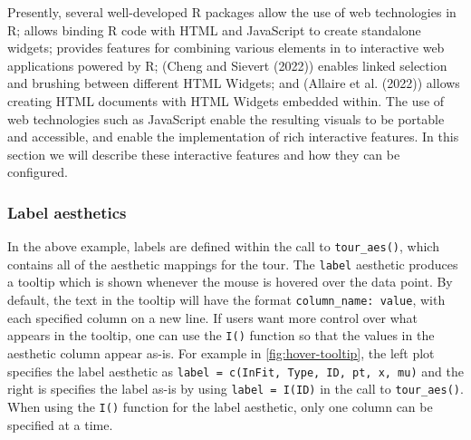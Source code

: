 Presently, several well-developed R packages allow the use of web technologies in R;  allows binding R code with HTML and JavaScript to create standalone widgets;  provides features for combining various elements in to interactive web applications powered by R;  (Cheng and Sievert (2022)) enables linked selection and brushing between different HTML Widgets; and  (Allaire et al. (2022)) allows creating HTML documents with HTML Widgets embedded within. The use of web technologies such as JavaScript enable the resulting visuals to be portable and accessible, and enable the implementation of rich interactive features. In this section we will describe these interactive features and how they can be configured.

\hypertarget{label-aesthetics}{%
\subsubsection{Label aesthetics}\label{label-aesthetics}}

In the above example, labels are defined within the call to \texttt{tour\_aes()}, which contains all of the aesthetic mappings for the tour. The \texttt{label} aesthetic produces a tooltip which is shown whenever the mouse is hovered over the data point. By default, the text in the tooltip will have the format \texttt{column\_name:\ value}, with each specified column on a new line. If users want more control over what appears in the tooltip, one can use the \texttt{I()} function so that the values in the aesthetic column appear as-is. For example in \ref{fig:hover-tooltip}, the left plot specifies the label aesthetic as \texttt{label\ =\ c(InFit,\ Type,\ ID,\ pt,\ x,\ mu)} and the right is specifies the label as-is by using \texttt{label\ =\ I(ID)} in the call to \texttt{tour\_aes()}. When using the \texttt{I()} function for the label aesthetic, only one column can be specified at a time.

